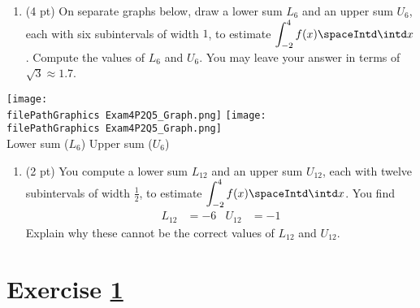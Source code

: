 \spaceSolution{0.5in}{%
}%



\newpage

\begin{enumerate}[resume,label=(\alph*)]
\item\label{itm : Exam4P2Q5c} (4 pt) On separate graphs below, draw a lower sum $L_{6}$ and an upper sum $U_{6}$, each with six subintervals of width $1$, to estimate $\displaystyle\int_{-2}^{4} f(x) \spaceIntd \intd x$. Compute the values of $L_{6}$ and $U_{6}$. You may leave your answer in terms of $\sqrt{3} \approx 1.7$.
\end{enumerate}
\begin{center}
\texttt{[image: \\filePathGraphics Exam4P2Q5\_Graph.png]}
\hspace{0.1\textwidth}
\texttt{[image: \\filePathGraphics Exam4P2Q5\_Graph.png]}
\\
Lower sum ($L_{6}$)
\hspace{0.35\textwidth}
Upper sum ($U_{6}$)
\end{center}

\spaceSolution{1in}{%
}%



\begin{enumerate}[resume,label=(\alph*)]
\item\label{itm : Exam4P2Q5d} (2 pt) You compute a lower sum $L_{12}$ and an upper sum $U_{12}$, each with twelve subintervals of width $\frac{1}{2}$, to estimate $\displaystyle\int_{-2}^{4} f(x) \spaceIntd \intd x$. You find
\begin{align*}
L_{12}
&=
-6
&
U_{12}
&=
-1
\end{align*}
Explain why these cannot be the correct values of $L_{12}$ and $U_{12}$.
\end{enumerate}

\spaceSolution{2in}{%
}%





%
%

\newpage





%
%
%
%


\newpage

\section{Exercise \ref{sec : Math112 Spring2022 FinalExam P3Q1}}
\label{sec : Math112 Spring2022 FinalExam P3Q1}

